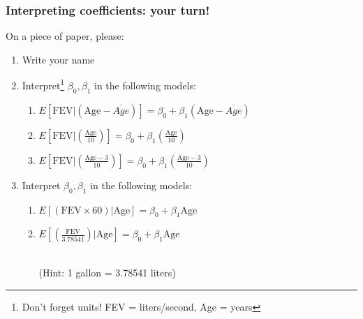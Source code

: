 \documentclass[12pt, 
hyperref={colorlinks=true, linkcolor=blue, urlcolor=cyan},dvipsnames]{beamer}
\begin{document}
\begin{frame}
\frametitle{Interpreting coefficients: your turn!}
On a piece of paper, please:\vspace{-0.3cm}
\begin{enumerate} \itemsep +5pt
\item Write your name
\item Interpret\footnote[frame]{\color{blue} Don't forget units! FEV = liters/second, Age = years} $\beta_0, \beta_1$ in the following models:
	\begin{enumerate}\itemsep +5pt
	\item $E[\text{FEV}|\left(\text{Age}-\overline{Age}\right)] = \beta_0 + \beta_1 \left(\text{Age}-\overline{Age}\right)$ 
	\item $E[\text{FEV}|\left(\frac{\text{Age}}{10}\right)] = \beta_0 + \beta_1 \left(\frac{\text{Age}}{10}\right)$ 
	\item $E[\text{FEV}|\left(\frac{\text{Age}-3}{10}\right)] = \beta_0 + \beta_1 \left(\frac{\text{Age}-3}{10}\right)$ 
	\end{enumerate}
\item Interpret $\beta_0, \beta_1$ in the following models:
	\begin{enumerate}\itemsep +5pt
	\item $E[(\text{FEV}\times 60)|\text{Age}] = \beta_0 + \beta_1 \text{Age}$ 
	\item $E[\left(\frac{\text{FEV}}{3.78541}\right)|\text{Age}] = \beta_0 + \beta_1 \text{Age}$ \begin{scriptsize}\\(Hint: 1 gallon = 3.78541 liters)\end{scriptsize}
	\end{enumerate}
\end{enumerate}
\end{frame}


\end{document}
